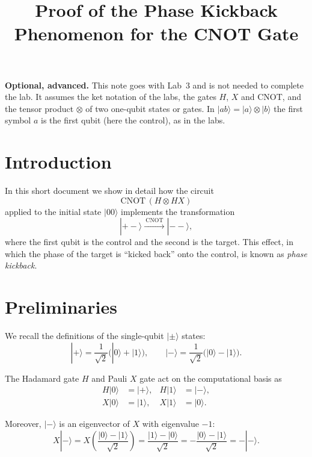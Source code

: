 \documentclass[a4paper,11pt]{article}
\title{Proof of the Phase Kickback Phenomenon for the CNOT Gate}
\author{}
\date{}
\providecommand{\ket}[1]{|{#1}\rangle}
\begin{document}
\maketitle

\noindent\textbf{Optional, advanced.} This note goes with Lab~3 and is not needed to complete the lab.
It assumes the ket notation of the labs, the gates $H$, $X$ and CNOT, and the tensor product $\otimes$ of
two one-qubit states or gates. In $\ket{ab}=\ket{a}\otimes\ket{b}$ the first symbol $a$ is the first qubit
(here the control), as in the labs.

\section*{Introduction}

In this short document we show in detail how the circuit
\[
\mathrm{CNOT}\, (H \otimes HX)
\]
applied to the initial state \(\ket{00}\) implements the transformation
\[
\ket{+ -} \xrightarrow{\ \mathrm{CNOT}\ } \ket{- -},
\]
where the first qubit is the control and the second is the target.
This effect, in which the phase of the target is ``kicked back'' onto
the control, is known as \emph{phase kickback}.

\section*{Preliminaries}

We recall the definitions of the single-qubit \(\ket{\pm}\) states:
\begin{equation}
  \ket{+} = \frac{1}{\sqrt{2}}\bigl(\ket{0} + \ket{1}\bigr),\qquad
  \ket{-} = \frac{1}{\sqrt{2}}\bigl(\ket{0} - \ket{1}\bigr).
\end{equation}

The Hadamard gate \(H\) and Pauli \(X\) gate act on the computational basis as
\begin{align}
  H\ket{0} &= \ket{+}, & H\ket{1} &= \ket{-}, \\
  X\ket{0} &= \ket{1}, & X\ket{1} &= \ket{0}.
\end{align}

Moreover, \(\ket{-}\) is an eigenvector of \(X\) with eigenvalue \(-1\):
\begin{equation}
  X\ket{-}
  = X\left(\frac{\ket{0}-\ket{1}}{\sqrt{2}}\right)
  = \frac{\ket{1}-\ket{0}}{\sqrt{2}}
  = -\frac{\ket{0}-\ket{1}}{\sqrt{2}}
  = -\ket{-}.
  \label{eq:Xminus}
\end{equation}
\end{document}

